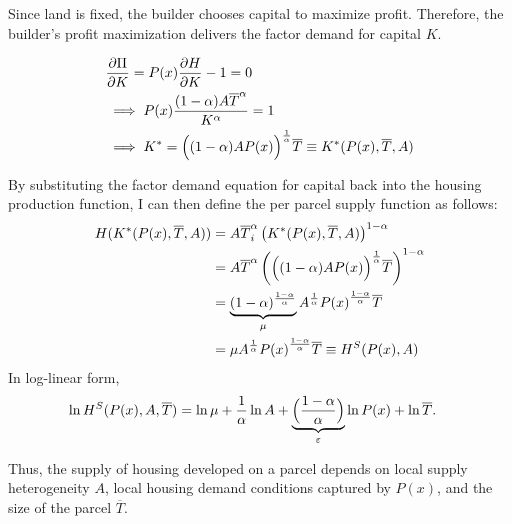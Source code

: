 \documentclass[
  12pt,
]{article}
\begin{document}
Since land is fixed, the builder chooses capital to maximize profit. Therefore, the builder's profit maximization delivers the factor demand for capital \(K\).

\[\begin{aligned}
&\frac{\partial \Pi}{\partial K} = P(x) \frac{\partial H}{\partial K} - 1 = 0\\
&\implies P(x) \frac{(1-\alpha) A \overline{T}^\alpha}{K^\alpha} = 1 \\
 &\implies K^* = \Bigl((1-\alpha)AP(x)\Bigr)^{\frac{1}{\alpha}}\overline{T}\equiv K^*(P(x), \overline{T}, A) \end{aligned}\]

By substituting the factor demand equation for capital back into the housing production function, I can then define the per parcel supply function as follows: \[
\begin{aligned}
H(K^*(P(x), \overline{T}, A)) &= A \overline{T}^\alpha_i \left(K^*(P(x), \overline{T}, A)\right)^{1-\alpha}\\
&= A \overline{T}^\alpha \left(\Bigl((1-\alpha)AP(x)\Bigr)^{\frac{1}{\alpha}}\overline{T}\right)^{1-\alpha}\\
&=\underbrace{(1-\alpha)^{\frac{1-\alpha}{\alpha}}}_{\mu}A^{\frac{1}{\alpha}}{P(x)}^{\frac{1-\alpha}{\alpha}}\overline{T}\\
&=\mu A^{\frac{1}{\alpha}}{P(x)}^{\frac{1-\alpha}{\alpha}}\overline{T} \equiv H^S(P(x), A)
\end{aligned}
\] In log-linear form, \begin{equation}
\begin{aligned}
\ln H^S(P(x), A, \overline{T}) &= \ln \mu + \frac{1}{\alpha}\ln A + \underbrace{\Bigl(\frac{1-\alpha}{\alpha}\Bigr)}_{\varepsilon}\ln P(x) + \ln \overline{T}.
\end{aligned}
\label{eq:app-hs}
\end{equation}

Thus, the supply of housing developed on a parcel depends on local supply heterogeneity \(A\), local housing demand conditions captured by \(P(x)\), and the size of the parcel \(\overline{T}\).
\end{document}
